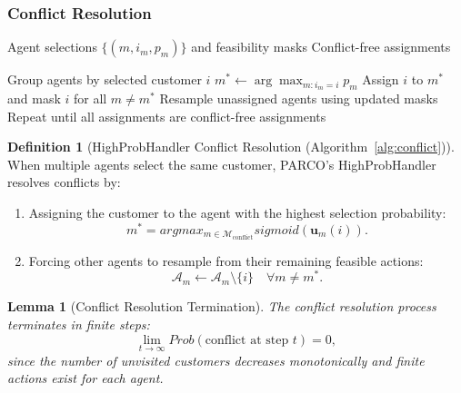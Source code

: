 \documentclass[journal,twoside,web]{ieeecolor}
\newtheorem{lemma}[theorem]{Lemma}
\theoremstyle{definition}
\newtheorem{definition}[theorem]{Definition}
\theoremstyle{remark}
\theoremstyle{definition}
\begin{document}
\subsubsection{Conflict Resolution}

\begin{algorithm}[htbp]
\caption{Conflict Resolution -- HighProbHandler}
\label{alg:conflict}
\begin{algorithmic}[1]
\Require Agent selections $\{(m,i_m,p_m)\}$ and feasibility masks
\Ensure Conflict-free assignments

\State Group agents by selected customer $i$
    \State $m^* \gets \arg\max_{m:i_m=i} p_m$
    \State Assign $i$ to $m^*$ and mask $i$ for all $m\neq m^*$
\EndFor
\State Resample unassigned agents using updated masks
\State Repeat until all assignments are conflict-free
\State \Return assignments
\end{algorithmic}
\end{algorithm}

\begin{definition}[HighProbHandler Conflict Resolution (Algorithm~\ref{alg:conflict})]
When multiple agents select the same customer, PARCO's HighProbHandler resolves conflicts by:
\begin{enumerate}
    \item Assigning the customer to the agent with the highest selection probability:
    \begin{equation}
    m^* = argmax_{m \in \mathcal{M}_{\text{conflict}}} sigmoid(\mathbf{u}_m(i)).
    \end{equation}
    \item Forcing other agents to resample from their remaining feasible actions:
    \begin{equation}
    \mathcal{A}_m \leftarrow \mathcal{A}_m \setminus \{i\} \quad \forall m \neq m^*.
    \end{equation}
\end{enumerate}
\end{definition}

\begin{lemma}[Conflict Resolution Termination]
The conflict resolution process terminates in finite steps:
\begin{equation}
\lim_{t \to \infty} Prob(\text{conflict at step } t) = 0,
\end{equation}
since the number of unvisited customers decreases monotonically and finite actions exist for each agent.
\end{lemma}
\end{document}
